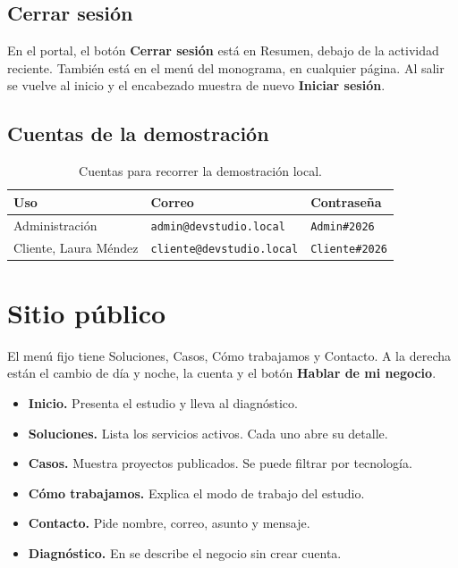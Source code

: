 \subsection{Cerrar sesión}

En el portal, el botón \textbf{Cerrar sesión} está en Resumen, debajo de la
actividad reciente. También está en el menú del monograma, en cualquier
página. Al salir se vuelve al inicio y el encabezado muestra de nuevo
\textbf{Iniciar sesión}.

\subsection{Cuentas de la demostración}

\begin{table}[H]
  \centering
  \caption{Cuentas para recorrer la demostración local.}
  \begin{tabular}{lll}
    \toprule
    Uso & Correo & Contraseña \\
    \midrule
    Administración & \texttt{admin@devstudio.local} & \texttt{Admin\#2026} \\
    Cliente, Laura Méndez & \texttt{cliente@devstudio.local} & \texttt{Cliente\#2026} \\
    \bottomrule
  \end{tabular}
\end{table}

\section{Sitio público}

El menú fijo tiene Soluciones, Casos, Cómo trabajamos y Contacto. A la derecha
están el cambio de día y noche, la cuenta y el botón \textbf{Hablar de mi
negocio}.

\begin{itemize}
  \item \textbf{Inicio.} Presenta el estudio y lleva al diagnóstico.
  \item \textbf{Soluciones.} Lista los servicios activos. Cada uno abre su detalle.
  \item \textbf{Casos.} Muestra proyectos publicados. Se puede filtrar por tecnología.
  \item \textbf{Cómo trabajamos.} Explica el modo de trabajo del estudio.
  \item \textbf{Contacto.} Pide nombre, correo, asunto y mensaje.
  \item \textbf{Diagnóstico.} En  se describe el negocio sin crear cuenta.
\end{itemize}

